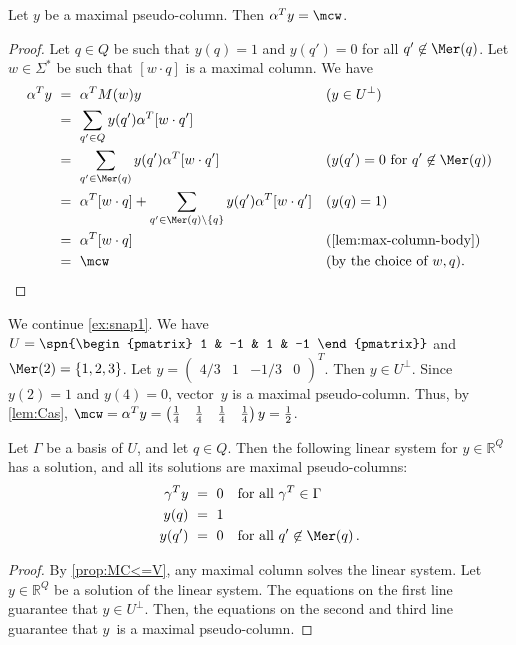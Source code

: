 \begin{lem} \label{lem:Cas}
Let $y$ be a maximal pseudo-column.
Then $\alpha^T y = \mcw$.
\end{lem}
\begin{proof}
Let $q \in Q$ be such that $y(q) = 1$ and $y(q') = 0$ for all $q' \not\in \Mer(q)$.
Let $w \in \Sigma^*$ be such that $[w \cdot q]$ is a maximal column.
We have
\begin{align*}
\alpha^T y \
&= \ \alpha^T M(w) y && (y \in U^\bot) \\
&= \ \sum_{q' \in Q} y(q') \alpha^T [w \cdot q'] \\
&= \ \sum_{q' \in \Mer(q)} y(q') \alpha^T [w \cdot q'] && (y(q') = 0 \text{ for } q' \not\in \Mer(q)) \\
&= \ \alpha^T [w \cdot q] + \sum_{q' \in \Mer(q) \setminus \{q\}} y(q') \alpha^T [w \cdot q'] && (y(q) = 1) \\
&= \ \alpha^T [w \cdot q] && (\text{\autoref{lem:max-column-body}}) \\
&= \ \mcw && (\text{by the choice of $w, q$}). \qedhere
\end{align*}
\end{proof}



\begin{exa} \label{ex:snap2}
We continue \autoref{ex:snap1}.
We have $U = \spn{\begin{pmatrix} 1 & -1 & 1 & -1 \end{pmatrix}}$ and $\Mer(2) = \{1,2,3\}$.
Let $y = \begin{pmatrix}4/3 & 1 & -1/3 & 0\end{pmatrix}^T$.
Then $y \in U^\bot$.
Since $y(2) = 1$ and $y(4) = 0$, vector~$y$ is a maximal pseudo-column.
Thus, by \autoref{lem:Cas}, $\mcw = \alpha^T y = \begin{pmatrix} \frac14 & \frac14 & \frac14 & \frac14 \end{pmatrix} y = \frac12$.
\end{exa}

\begin{thm}\label{thm:pseud-linsyst}
Let $\Gamma$ be a basis of $U$, and let $q \in Q$.
Then the following linear system for $y \in \mathbb{R}^Q$ has a solution, and all its solutions are maximal pseudo-columns:
\begin{align*}
 \gamma^T y \ &= \ 0 \quad \text{for all } \gamma^T \in \Gamma \\
 y(q) \ &= \ 1 \\
 y(q') \ &= \ 0 \quad \text{for all } q' \not \in \Mer(q)\,.
\end{align*}
\end{thm}
\begin{proof}
By \autoref{prop:MC<=V}, any maximal column solves the linear system.
Let $y \in \mathbb{R}^Q$ be a solution of the linear system.
The equations on the first line guarantee that $y \in U^\bot$.
Then, the equations on the second and third line guarantee that $y$~is a maximal pseudo-column.
\end{proof}




